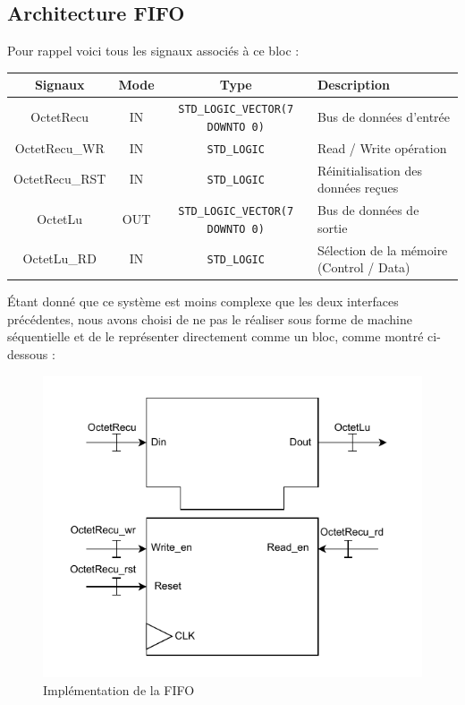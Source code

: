\subsection{Architecture FIFO}

Pour rappel voici tous les signaux associés à ce bloc : 
\newline

\begin{center}
\renewcommand{\arraystretch}{1.2} %
\small %
    \begin{tabularx}{\textwidth}{|c||c|c|X|}
     \hline				
       \textbf{Signaux} & \textbf{Mode} & \textbf{Type} & \textbf{Description}  \\ \hline 
       OctetRecu & IN & \texttt{STD\_LOGIC\_VECTOR(7 DOWNTO 0)} & Bus de données d’entrée \\
       OctetRecu\_WR & IN & \texttt{STD\_LOGIC} & Read / Write opération \\
       OctetRecu\_RST & IN & \texttt{STD\_LOGIC} & Réinitialisation des données reçues \\
       OctetLu & OUT & \texttt{STD\_LOGIC\_VECTOR(7 DOWNTO 0)} & Bus de données de sortie \\
       OctetLu\_RD & IN & \texttt{STD\_LOGIC} & Sélection de la mémoire (Control / Data) \\
     \hline  
    \end{tabularx}
\end{center}

Étant donné que ce système est moins complexe que les deux interfaces précédentes, nous avons choisi de ne pas le réaliser sous forme de machine séquentielle et de le représenter directement comme un bloc, comme montré ci-dessous : 
\newline

\begin{figure}[H]
    \centering
    \includegraphics[width=0.8\linewidth]{images/inter/Implementation_FIFO.pdf}
    \caption{Implémentation de la FIFO}
    \label{fig:placeholder}
\end{figure}

